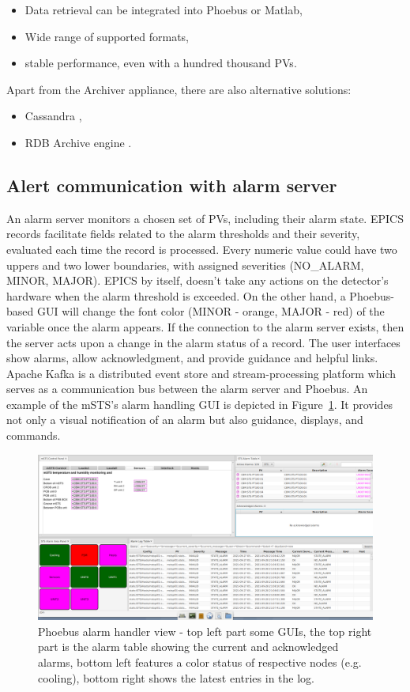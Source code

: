 \begin{itemize}
    \item Data retrieval can be integrated into Phoebus or Matlab,
    \item Wide range of supported formats,
    \item stable performance, even with a hundred thousand \glspl{PV}.
\end{itemize}

Apart from the Archiver appliance, there are also alternative solutions:

\begin{itemize}
    \item Cassandra \cite{cassandra_archive},
    \item RDB Archive engine \cite{rdb_archive}.
\end{itemize}

\subsection{Alert communication with alarm server}
An alarm server monitors a chosen set of \glspl{PV}, including their alarm state. \gls{EPICS} records facilitate fields related to the alarm thresholds and their severity, evaluated each time the record is processed. Every numeric value could have two uppers and two lower boundaries, with assigned severities (NO\_ALARM, MINOR, MAJOR). \gls{EPICS} by itself, doesn't take any actions on the detector's hardware when the alarm threshold is exceeded. On the other hand, a Phoebus-based \gls{GUI} will change the font color (MINOR - orange, MAJOR - red) of the variable once the alarm appears. If the connection to the alarm server exists, then the server acts upon a change in the alarm status of a record. The user interfaces show alarms, allow acknowledgment, and provide guidance and helpful links. Apache Kafka is a distributed event store and stream-processing platform which serves as a communication bus between the alarm server and Phoebus. An example of the \gls{mSTS}'s alarm handling \gls{GUI} is depicted in Figure~\ref{fig_alarm1}. It provides not only a visual notification of an alarm but also guidance, displays, and commands.
\begin{figure}[!h]
\centering
\includegraphics[width=1\columnwidth]{Chapter4/images/alarms.png}
\caption{Phoebus alarm handler view -  top left part some \gls{GUI}s, the top right part is the alarm table showing the current and acknowledged alarms, bottom left features a color status of respective nodes (e.g. cooling), bottom right shows the latest entries in the log.}
\label{fig_alarm1}
\end{figure}
\newpage
